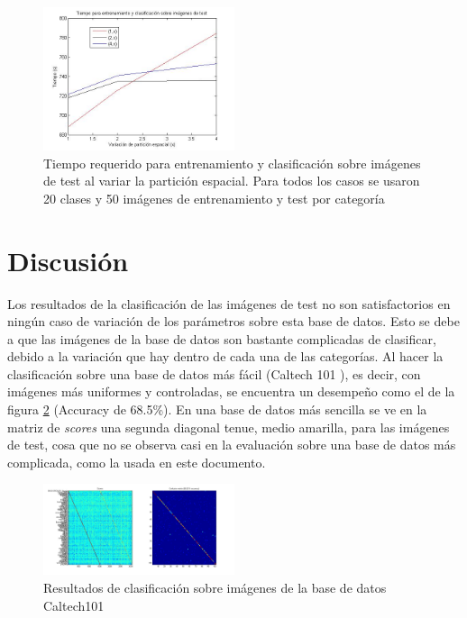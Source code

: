 \documentclass[10pt,twocolumn,letterpaper]{article}
\begin{document}
\begin{figure}[h]
    \centering
    \includegraphics[width=0.5\textwidth]{TiempoVariacionNumSpatialX.jpg}
    \caption{Tiempo requerido para entrenamiento y clasificación sobre imágenes de test al variar la partición espacial. Para todos los casos se usaron 20 clases y 50 imágenes de entrenamiento y test por categoría}
    \label{fig:tiempoparticion}
\end{figure}

\section{Discusión}
Los resultados de la clasificación de las imágenes de test no son satisfactorios en ningún caso de variación de los parámetros sobre esta base de datos. Esto se debe a que las imágenes de la base de datos son bastante complicadas de clasificar, debido a la variación que hay dentro de cada una de las categorías. Al hacer la clasificación sobre una base de datos más fácil (Caltech 101 \cite{Caltech}), es decir, con imágenes más uniformes y controladas, se encuentra un desempeño como el de la figura \ref{fig:caltech} (Accuracy de 68.5\%). En una base de datos más sencilla se ve en la matriz de \textit{scores} una segunda diagonal tenue, medio amarilla, para las imágenes de test, cosa que no se observa casi en la evaluación sobre una base de datos más complicada, como la usada en este documento.

\begin{figure}[h]
    \centering
    \includegraphics[width=0.5\textwidth]{ResultadosCaltech.jpg}
    \caption{Resultados de clasificación sobre imágenes de la base de datos Caltech101}
    \label{fig:caltech}
\end{figure}
\end{document}
